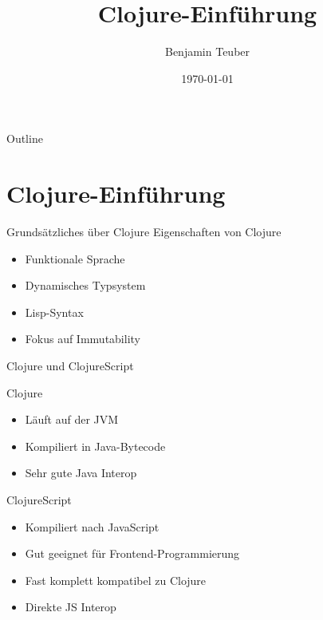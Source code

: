 \documentclass[presentation]{beamer}
\author{Benjamin Teuber}
\date{\today}
\title{Clojure-Einführung}
\begin{document}
\maketitle
\begin{frame}{Outline}
\tableofcontents
\end{frame}

\def\cpp{C++}

\section{Clojure-Einführung}

\begin{frame}{Grundsätzliches über Clojure}
  Eigenschaften von Clojure
  \begin{itemize}
  \item Funktionale Sprache
  \item Dynamisches Typsystem
  \item Lisp-Syntax
  \item Fokus auf Immutability
  \end{itemize}
\end{frame}

\begin{frame}{Clojure und ClojureScript}
  \begin{block}{Clojure}
    \begin{itemize}
    \item Läuft auf der JVM
    \item Kompiliert in Java-Bytecode
    \item Sehr gute Java Interop
    \end{itemize}
  \end{block}

  \begin{block}{ClojureScript}
    \begin{itemize}
    \item Kompiliert nach JavaScript
    \item Gut geeignet für Frontend-Programmierung
    \item Fast komplett kompatibel zu Clojure
    \item Direkte JS Interop
    \end{itemize}
  \end{block}
\end{frame}
\end{document}
